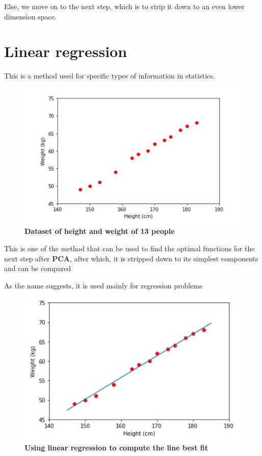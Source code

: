 \documentclass{article}
\begin{document}
Else, we move on to the next step, which is to strip it down to an even lower dimension space.

\section{Linear regression}

This is a method used for specific types of information in statistics.

\begin{figure}[h]
    \includegraphics[width=12cm]{Capture2.PNG}
    \caption{\textbf{Dataset of height and weight of 13 people}}
\end{figure}





This is one of the method that can be used to find the optimal functions for the next step after \textbf{PCA}, after which, it is stripped down to its simplest components and can be compared

As the name suggests, it is used mainly for regression problems

\begin{figure}[H]
    \includegraphics[width=12cm]{Capture3.PNG}
    \caption{\textbf{Using linear regression to compute the line best fit}}
\end{figure}
\end{document}
